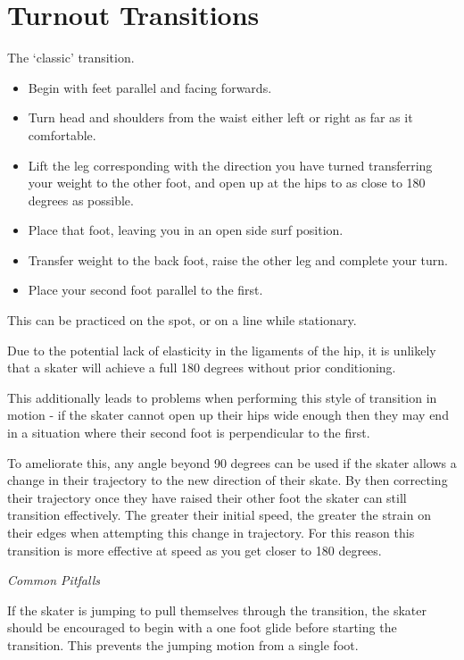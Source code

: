 \section{Turnout Transitions}
\label{sec:transitions/turnout}

The `classic' transition.

\begin{itemize}
\item Begin with feet parallel and facing forwards. 
\item Turn head and shoulders from the waist either left or right as far as it comfortable.   
\item Lift the leg corresponding with the direction you have turned transferring your weight to the other foot, and open up at the hips to as close to 180 degrees as possible.     
\item Place that foot, leaving you in an open side surf position.  
\item Transfer weight to the back foot, raise the other leg and complete your turn.   
\item Place your second foot parallel to the first. 
\end{itemize}

This can be practiced on the spot, or on a line while stationary. 

Due to the potential lack of elasticity in the ligaments of the hip, it is unlikely that a skater will achieve a full 180 degrees without prior conditioning.

This additionally leads to problems when performing this style of transition in motion - if the skater cannot open up their hips wide enough then they may end in a situation where their second foot is perpendicular to the first.

To ameliorate this, any angle beyond 90 degrees can be used if the skater allows a change in their trajectory to the new direction of their skate.
By then correcting their trajectory once they have raised their other foot the skater can still transition effectively.   
The greater their initial speed, the greater the strain on their edges when attempting this change in trajectory. 
For this reason this transition is more effective at speed as you get closer to 180 degrees.


{\it Common Pitfalls}

If the skater is jumping to pull themselves through the transition, the skater should be encouraged to begin with a one foot glide before starting the transition.   
This prevents the jumping motion from a single foot.
